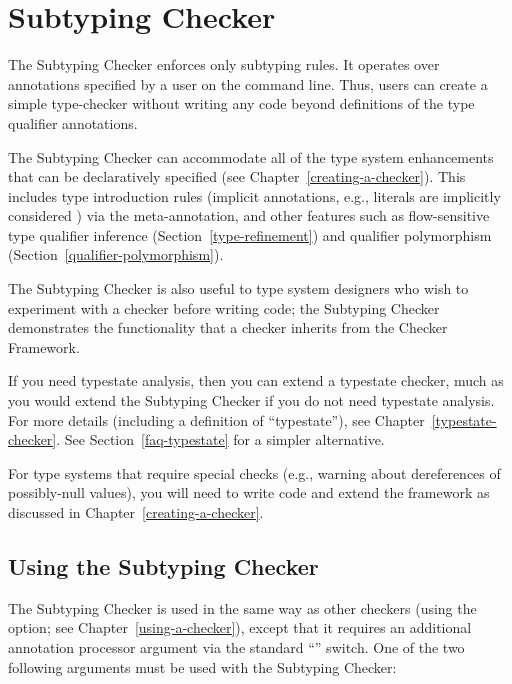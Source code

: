 \htmlhr
\chapter{Subtyping Checker\label{subtyping-checker}}

The Subtyping Checker enforces only subtyping rules.  It operates over
annotations specified by a user on the command line.  Thus, users can
create a simple type-checker without writing any code beyond definitions of
the type qualifier annotations.

The Subtyping Checker can accommodate all of the type system enhancements that
can be declaratively specified (see Chapter~\ref{creating-a-checker}).
This includes type introduction rules (implicit
annotations, e.g., literals are implicitly considered ) via
the  meta-annotation, and other features such as
flow-sensitive type qualifier inference (Section~\ref{type-refinement}) and
qualifier polymorphism (Section~\ref{qualifier-polymorphism}).

The Subtyping Checker is also useful to type system designers who wish to
experiment with a checker before writing code; the Subtyping Checker
demonstrates the functionality that a checker inherits from the Checker
Framework.

If you need typestate analysis, then you can extend a typestate checker,
much as you would extend the Subtyping Checker if you do not need typestate
analysis.  For more details (including a definition of ``typestate''), see
Chapter~\ref{typestate-checker}.
See Section~\ref{faq-typestate} for a simpler alternative.

For type systems that require special checks (e.g., warning about
dereferences of possibly-null values), you will need to write code and
extend the framework as discussed in Chapter~\ref{creating-a-checker}.


\section{Using the Subtyping Checker\label{subtyping-using}}

\begin{sloppypar}
The Subtyping Checker is used in the same way as other checkers (using the
 option; see Chapter~\ref{using-a-checker}), except that it
requires an additional annotation processor argument via the standard
``'' switch. One of the two following arguments must be used with the
Subtyping Checker:
\end{sloppypar}

